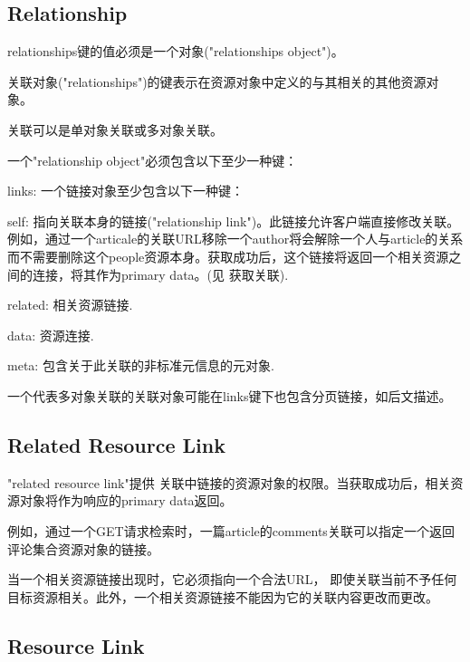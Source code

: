 \subsection{Relationship}

relationships键的值必须是一个对象("relationships object")。

关联对象("relationships")的键表示在资源对象中定义的与其相关的其他资源对象。

关联可以是单对象关联或多对象关联。

一个"relationship object"必须包含以下至少一种键：

\begin{compactitem}
\item links: 一个链接对象至少包含以下一种键：

\begin{compactenum}
\item self: 指向关联本身的链接("relationship link")。此链接允许客户端直接修改关联。例如，通过一个articale的关联URL移除一个author将会解除一个人与article的关系而不需要删除这个people资源本身。获取成功后，这个链接将返回一个相关资源之间的连接，将其作为primary data。(见 获取关联).
\item related: 相关资源链接.
\end{compactenum}

\item data: 资源连接.
\item meta: 包含关于此关联的非标准元信息的元对象.
\end{compactitem}

一个代表多对象关联的关联对象可能在links键下也包含分页链接，如后文描述。

\subsection{Related Resource Link}

"related resource link"提供 关联中链接的资源对象的权限。当获取成功后，相关资源对象将作为响应的primary data返回。

例如，通过一个GET请求检索时，一篇article的comments关联可以指定一个返回评论集合资源对象的链接。

当一个相关资源链接出现时，它必须指向一个合法URL， 即使关联当前不予任何目标资源相关。此外，一个相关资源链接不能因为它的关联内容更改而更改。



\subsection{Resource Link}

